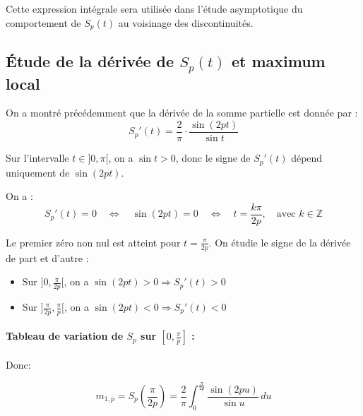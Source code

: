 \documentclass[11pt]{article} %
\begin{document}
\begin{large}
Cette expression intégrale sera utilisée dans l'étude asymptotique du comportement de \( S_p(t) \) au voisinage des discontinuités.






\subsection{Étude de la dérivée de \( S_p(t) \) et maximum local}

On a montré précédemment que la dérivée de la somme partielle est donnée par :
\[
S_p'(t) = \frac{2}{\pi} \cdot \frac{\sin(2pt)}{\sin t}
\]

Sur l'intervalle \( t \in ]0, \pi[ \), on a \( \sin t > 0 \), donc le signe de \( S_p'(t) \) dépend uniquement de \( \sin(2pt) \).

On a : 
\[
S_p'(t) = 0 \quad \Leftrightarrow \quad \sin(2pt) = 0 \quad \Leftrightarrow \quad t = \frac{k\pi}{2p} , \quad \text{avec } k \in \mathbb{Z}
\]

Le premier zéro non nul est atteint pour \( t = \frac{\pi}{2p} \).  
On étudie le signe de la dérivée de part et d’autre :

\begin{itemize}
  \item Sur \( ]0, \frac{\pi}{2p}[ \), on a \( \sin(2pt) > 0 \Rightarrow S_p'(t) > 0 \)
  \item Sur \( ]\frac{\pi}{2p}, \frac{\pi}{p}[ \), on a \( \sin(2pt) < 0 \Rightarrow S_p'(t) < 0 \)
\end{itemize}

\paragraph{Tableau de variation de \( S_p \) sur \( [0, \frac{\pi}{p}] \) :}

\begin{center}
\end{center}


Donc:

\[
m_{1,p} = S_p\left( \frac{\pi}{2p} \right)
= \frac{2}{\pi} \int_0^{\frac{\pi}{2p}} \frac{\sin(2pu)}{\sin u} \, du
\]










\end{large}
\end{document}
